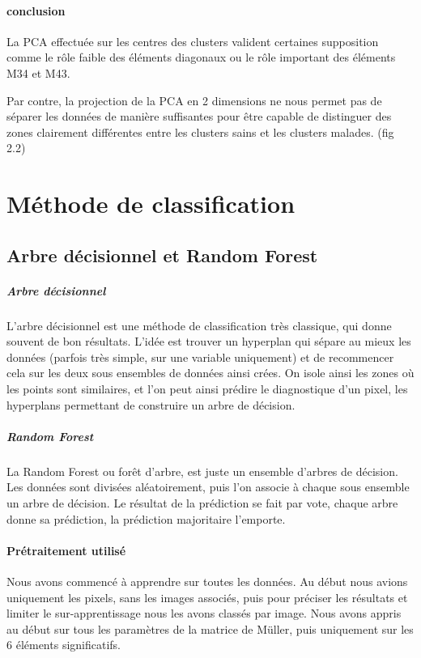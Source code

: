 \documentclass[a4paper,10pt]{report}
\begin{document}
\paragraph{conclusion}
La PCA effectuée sur les centres des clusters valident certaines supposition comme le rôle faible des éléments diagonaux ou le rôle important des éléments M34 et M43.

Par contre, la projection de la PCA en 2 dimensions ne nous permet pas de séparer les données de manière suffisantes pour être capable de distinguer des zones clairement différentes entre les clusters sains et les clusters malades. (fig 2.2)
\section{Méthode de classification}

\subsection{Arbre décisionnel et Random Forest}
\subparagraph{Arbre décisionnel} 
L'arbre décisionnel est une méthode de classification très classique, qui donne souvent de bon résultats. L'idée est trouver un hyperplan qui sépare au mieux les données (parfois très simple, sur une variable uniquement) et de recommencer cela sur les deux sous ensembles de données ainsi crées. On isole ainsi les zones où les points sont similaires, et l'on peut ainsi prédire le diagnostique d'un pixel, les hyperplans permettant de construire un arbre de décision.
\subparagraph{Random Forest}
La Random Forest ou forêt d'arbre, est juste un ensemble d'arbres de décision. Les données sont divisées aléatoirement, puis l'on associe à chaque sous ensemble un arbre de décision. Le résultat de la prédiction se fait par vote, chaque arbre donne sa prédiction, la prédiction majoritaire l'emporte.
\paragraph{Prétraitement utilisé}
Nous avons commencé à apprendre sur toutes les données. Au début nous avions uniquement les pixels, sans les images associés, puis pour préciser les résultats et limiter le sur-apprentissage nous les avons classés par image. Nous avons appris au début sur tous les paramètres de la matrice de Müller, puis uniquement sur les 6 éléments significatifs.
\end{document}
